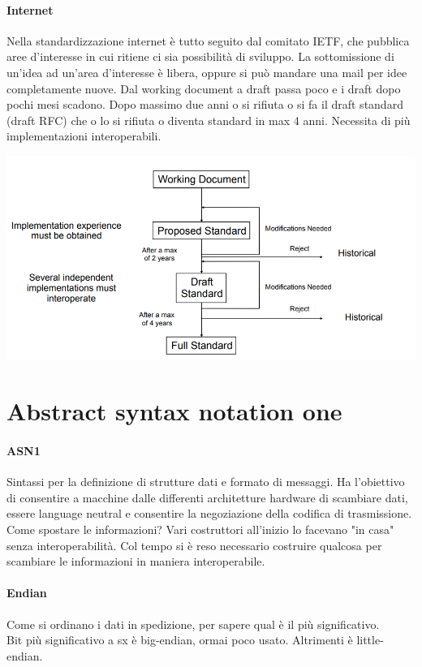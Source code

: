 \documentclass[10pt]{book}
\begin{document}
\paragraph{Internet} Nella standardizzazione internet è tutto seguito dal comitato IETF, che pubblica aree d'interesse in cui ritiene ci sia possibilità di sviluppo. La sottomissione di un'idea ad un'area d'interesse è libera, oppure si può mandare una mail per idee completamente nuove. Dal working document a draft passa poco e i draft dopo pochi mesi scadono. Dopo massimo due anni o si rifiuta o si fa il draft standard (draft RFC) che o lo si rifiuta o diventa standard in max 4 anni. Necessita di più implementazioni interoperabili.
\begin{center}
	\includegraphics[scale=0.7]{stdietf.png}
\end{center}
\section{Abstract syntax notation one}
\paragraph{ASN1} Sintassi per la definizione di strutture dati e formato di messaggi. Ha l'obiettivo di consentire a macchine dalle differenti architetture hardware di scambiare dati, essere language neutral e consentire la negoziazione della codifica di trasmissione.\\
Come spostare le informazioni? Vari costruttori all'inizio lo facevano "in casa" senza interoperabilità. Col tempo si è reso necessario costruire qualcosa per scambiare le informazioni in maniera interoperabile.
\paragraph{Endian} Come si ordinano i dati in spedizione, per sapere qual è il più significativo.\\
Bit più significativo a sx è big-endian, ormai poco usato. Altrimenti è little-endian.
\end{document}
